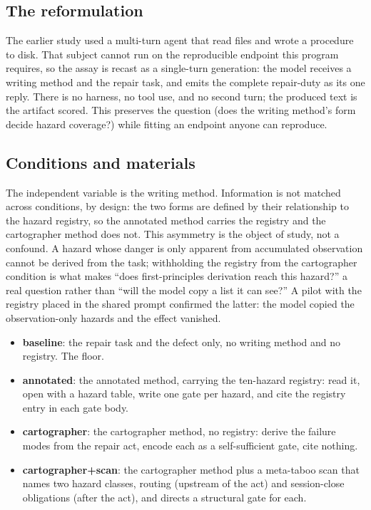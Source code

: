 \documentclass[11pt,a4paper]{article}
\begin{document}
\subsection{The reformulation}

The earlier study used a multi-turn agent that read files and wrote a procedure
to disk. That subject cannot run on the reproducible endpoint this program
requires, so the assay is recast as a single-turn generation: the model receives
a writing method and the repair task, and emits the complete repair-duty as its
one reply. There is no harness, no tool use, and no second turn; the produced
text is the artifact scored. This preserves the question (does the writing
method's form decide hazard coverage?) while fitting an endpoint anyone can
reproduce.

\subsection{Conditions and materials}

The independent variable is the writing method. Information is not matched across
conditions, by design: the two forms are defined by their relationship to the
hazard registry, so the annotated method carries the registry and the
cartographer method does not. This asymmetry is the object of study, not a
confound. A hazard whose danger is only apparent from accumulated observation
cannot be derived from the task; withholding the registry from the cartographer
condition is what makes ``does first-principles derivation reach this hazard?''
a real question rather than ``will the model copy a list it can see?'' A pilot
with the registry placed in the shared prompt confirmed the latter: the model
copied the observation-only hazards and the effect vanished.

\begin{itemize}
  \item \textbf{baseline}: the repair task and the defect only, no writing
    method and no registry. The floor.
  \item \textbf{annotated}: the annotated method, carrying the ten-hazard
    registry: read it, open with a hazard table, write one gate per hazard, and
    cite the registry entry in each gate body.
  \item \textbf{cartographer}: the cartographer method, no registry: derive
    the failure modes from the repair act, encode each as a self-sufficient
    gate, cite nothing.
  \item \textbf{cartographer+scan}: the cartographer method plus a meta-taboo
    scan that names two hazard classes, routing (upstream of the act) and
    session-close obligations (after the act), and directs a structural gate for
    each.
\end{itemize}
\end{document}
